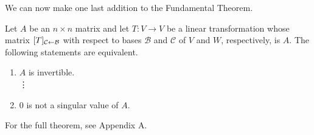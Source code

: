 \documentclass[../m073main.tex]{subfiles}
\begin{document}
We can now make one last addition to the Fundamental Theorem.

\begin{theorem}
	Let $A$ be an $n\times n$ matrix and let $T : V \to V$ be a linear transformation whose matrix $[T]_{\mathcal{C} \leftarrow \mathcal{B}}$ with respect to bases $\mathcal{B}$ and $\mathcal{C}$ of $V$ and $W$, respectively, is $A$.
	The following statements are equivalent.
	\begin{enumerate}[label=(\alph*)]
		\item $A$ is invertible. \\
		\phantom{~}\hspace{-19.5pt} \vdots
		\setcounter{enumi}{20}
		\item 0 is not a singular value of $A$.
	\end{enumerate}
	For the full theorem, see Appendix A.
\end{theorem}
\end{document}
